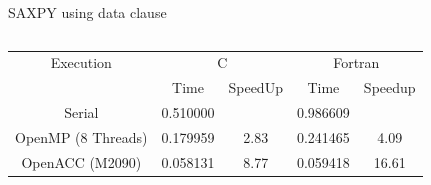 \documentclass[c,mathserif,compress,xcolor=svgnames]{beamer}
\newenvironment{eblock}[0]
{
\begin{beamerboxesrounded}[upper=uppercol2,lower=lowercol2,shadow=true]}
{\end{beamerboxesrounded}}
\begin{document}
\begin{frame}{\small SAXPY using data clause}
%      
%      
  \begin{columns}
    \begin{eblock}{}
      \begin{tabular}{|c|c|c|c|c|}
        \hline
        Execution& \multicolumn{2}{c|}{C}& \multicolumn{2}{c|}{Fortran} \\
        \cline{2-5}
        &  Time & SpeedUp & Time & Speedup \\
        \hline
        Serial & 0.510000 & & 0.986609 & \\
        OpenMP (8 Threads) & 0.179959 & 2.83 & 0.241465 & 4.09 \\
        OpenACC (M2090) & 0.058131 & 8.77 & 0.059418 & 16.61 \\
          \hline
      \end{tabular}
    \end{eblock}
  \end{columns}
\end{frame}
\end{document}

